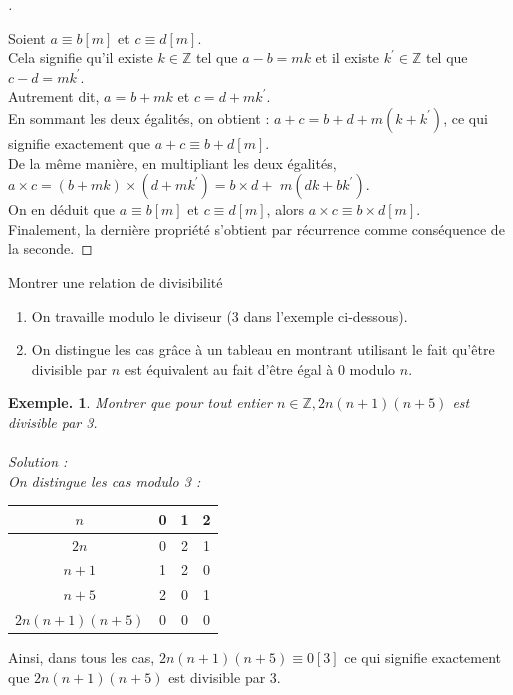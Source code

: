 \documentclass[12pt]{article}
\theoremstyle{break}
\newtheorem*{example}{Exemple.}
\newenvironment{demo}[1][\proofname]{%
  \begin{proof}[#1]$ $\newline
}{%
  \end{proof}
}
\begin{document}
\begin{demo}
    Soient $a \equiv b[m]$ et $c \equiv d[m]$.\\
    Cela signifie qu'il existe $k \in \mathbb{Z}$ tel que $a-b=m k$ et il existe $k^{\prime} \in \mathbb{Z}$ tel que $c-d=m k^{\prime}$.\\
    Autrement dit, $a=b+m k$ et $c=d+m k^{\prime}$.\\
    En sommant les deux égalités, on obtient : $a+c=b+d+m\left(k+k^{\prime}\right)$, ce qui signifie exactement que $a+c \equiv b+d[m]$.\\
    De la même manière, en multipliant les deux égalités, $a \times c=(b+m k) \times\left(d+m k^{\prime}\right)=b \times d+$ $m\left(d k+b k^{\prime}\right)$.\\
    On en déduit que $a \equiv b[m]$ et $c \equiv d[m]$, alors $a \times c \equiv b \times d[m]$.\\
    Finalement, la dernière propriété s'obtient par récurrence comme conséquence de la seconde.
\end{demo}

\begin{method}{Montrer une relation de divisibilité}{}
    \begin{enumerate}[noitemsep,topsep=0pt]
      \item On travaille modulo le diviseur (3 dans l'exemple ci-dessous).
      \item On distingue les cas grâce à un tableau en montrant utilisant le fait qu'être divisible par $n$ est équivalent au fait d'être égal à 0 modulo $n$.
    \end{enumerate}
\end{method}

\begin{example}
Montrer que pour tout entier $n \in \mathbb{Z}, 2 n(n+1)(n+5)$ est divisible par 3.\\\\
Solution :\\
On distingue les cas modulo 3 :
\end{example}

\begin{center}
\begin{tabular}{|c|c|c|c|}
\hline
$n$ & 0 & 1 & 2 \\
\hline
$2 n$ & 0 & 2 & 1 \\
\hline
$n+1$ & 1 & 2 & 0 \\
\hline
$n+5$ & 2 & 0 & 1 \\
\hline
$2 n(n+1)(n+5)$ & 0 & 0 & 0 \\
\hline
\end{tabular}
\end{center}
\noindent
Ainsi, dans tous les cas, $2 n(n+1)(n+5) \equiv 0[3]$ ce qui signifie exactement que $2 n(n+1)(n+5)$ est divisible par 3.
\end{document}
